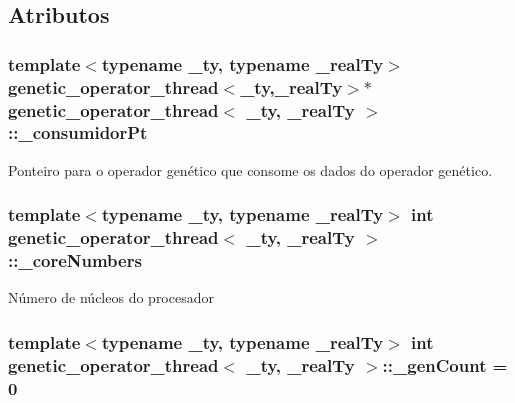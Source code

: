 \subsection{Atributos}
\hypertarget{classgenetic__operator__thread_ad88e4f6c5afb05bbc55d5f44bce88ba2}{
\subsubsection[{\_\-consumidorPt}]{\setlength{\rightskip}{0pt plus 5cm}template$<$typename \_\-ty, typename \_\-realTy$>$ {\bf genetic\_\-operator\_\-thread}$<$\_\-ty,\_\-realTy$>$$\ast$ {\bf genetic\_\-operator\_\-thread}$<$ \_\-ty, \_\-realTy $>$::{\bf \_\-consumidorPt}}}
\label{classgenetic__operator__thread_ad88e4f6c5afb05bbc55d5f44bce88ba2}
Ponteiro para o operador genético que consome os dados do operador genético. \hypertarget{classgenetic__operator__thread_a886d986c24ceb36bff5a77bf58447be0}{
\subsubsection[{\_\-coreNumbers}]{\setlength{\rightskip}{0pt plus 5cm}template$<$typename \_\-ty, typename \_\-realTy$>$ int {\bf genetic\_\-operator\_\-thread}$<$ \_\-ty, \_\-realTy $>$::{\bf \_\-coreNumbers}}}
\label{classgenetic__operator__thread_a886d986c24ceb36bff5a77bf58447be0}
Número de núcleos do procesador \hypertarget{classgenetic__operator__thread_acdf9606e26ae1240cd1c9fced36c656a}{
\subsubsection[{\_\-genCount}]{\setlength{\rightskip}{0pt plus 5cm}template$<$typename \_\-ty, typename \_\-realTy$>$ int {\bf genetic\_\-operator\_\-thread}$<$ \_\-ty, \_\-realTy $>$::{\bf \_\-genCount} = 0}}

